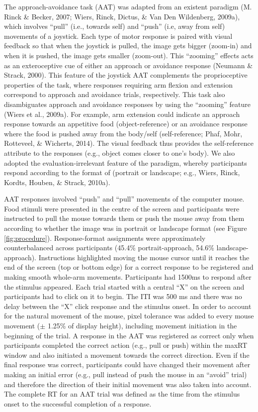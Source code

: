 \documentclass[man,floatsintext]{apa6}
\begin{document}
The approach-avoidance task (AAT) was adapted from an existent paradigm
(M. Rinck \& Becker, 2007; Wiers, Rinck, Dictus, \& Van Den Wildenberg,
2009a), which involves \enquote{pull} (i.e., towards self) and
\enquote{push} (i.e, away from self) movements of a joystick. Each type
of motor response is paired with visual feedback so that when the
joystick is pulled, the image gets bigger (zoom-in) and when it is
pushed, the image gets smaller (zoom-out). This \enquote{zooming}
effects acts as an exteroceptive cue of either an approach or avoidance
response (Neumann \& Strack, 2000). This feature of the joystick AAT
complements the proprioceptive properties of the task, where responses
requiring arm flexion and extension correspond to approach and avoidance
trials, respectively. This task also disambiguates approach and
avoidance responses by using the \enquote{zooming} feature (Wiers et
al., 2009a). For example, arm extension could indicate an approach
response towards an appetitive food (object-reference) or an avoidance
response where the food is pushed away from the body/self
(self-reference; Phaf, Mohr, Rotteveel, \& Wicherts, 2014). The visual
feedback thus provides the self-reference attribute to the responses
(e.g., object comes closer to one's body). We also adopted the
evaluation-irrelevant feature of the paradigm, whereby participants
respond according to the format of (portrait or landscape; e.g., Wiers,
Rinck, Kordts, Houben, \& Strack, 2010a).

\par

AAT responses involved \enquote{push} and \enquote{pull} movements of
the computer mouse. Food stimuli were presented in the centre of the
screen and participants were instructed to pull the mouse towards them
or push the mouse away from them according to whether the image was in
portrait or landscape format (see Figure \ref{fig:procedure}).
Response-format assignments were approximately counterbalanced across
participants (45.4\% portrait-approach, 54.6\% landscape-approach).
Instructions highlighted moving the mouse cursor until it reaches the
end of the screen (top or bottom edge) for a correct response to be
registered and making smooth whole-arm movements. Participants had
1500ms to respond after the stimulus appeared. Each trial started with a
central \enquote{X} on the screen and participants had to click on it to
begin. The ITI was 500 ms and there was no delay between the \enquote{X}
click response and the stimulus onset. In order to account for the
natural movement of the mouse, pixel tolerance was added to every mouse
movement (\(\pm\) 1.25\% of display height), including movement
initiation in the beginning of the trial. A response in the AAT was
registered as correct only when participants completed the correct
action (e.g., pull or push) within the maxRT window and also initiated a
movement towards the correct direction. Even if the final response was
correct, participants could have changed their movement after making an
initial error (e.g., pull instead of push the mouse in an
\enquote{avoid} trial) and therefore the direction of their initial
movement was also taken into account. The complete RT for an AAT trial
was defined as the time from the stimulus onset to the successful
completion of a response.
\end{document}
